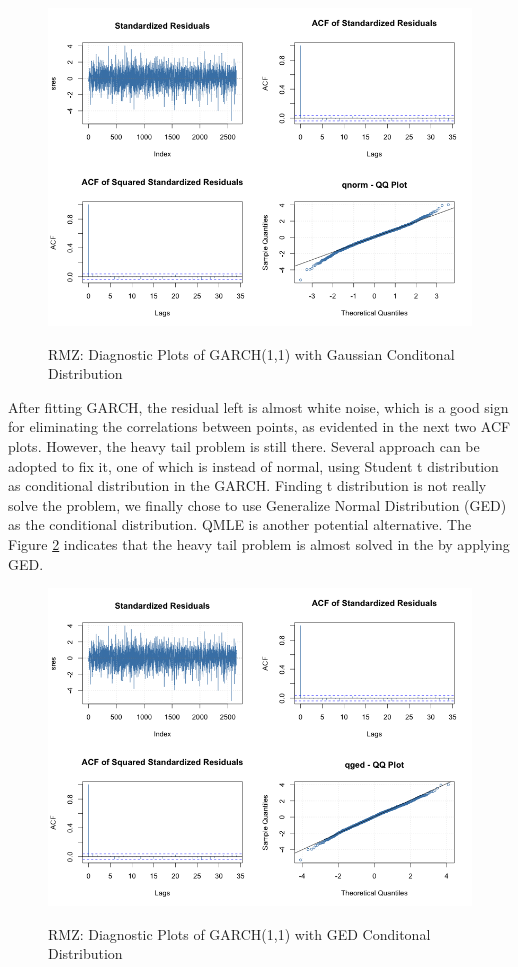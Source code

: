 \documentclass[12pt]{article}
\begin{document}
\begin{figure}
  \caption{RMZ: Diagnostic Plots of GARCH(1,1) with Gaussian Conditonal Distribution}
  \includegraphics[width = \textwidth]{../results/RMZ_GARCH_dig1}
  \label{fig:RMZ_GARCH_dig1}
\end{figure}

After fitting GARCH, the residual left is almost white noise, which is a good sign for eliminating the correlations between points, as evidented in the next two ACF plots. However, the heavy tail problem is still there. Several approach can be adopted to fix it, one of which is instead of normal, using Student t distribution as conditional distribution in the GARCH. Finding t distribution is not really solve the problem, we finally chose to use Generalize Normal Distribution (GED) as the conditional distribution. QMLE is another potential alternative. The Figure \ref{fig:RMZ_GARCH_dig2} indicates that the heavy tail problem is almost solved in the by applying GED.

\begin{figure}
  \caption{RMZ: Diagnostic Plots of GARCH(1,1) with GED Conditonal Distribution}
  \includegraphics[width = \textwidth]{../results/RMZ_GARCH_dig2}
  \label{fig:RMZ_GARCH_dig2}
\end{figure}
\end{document}
